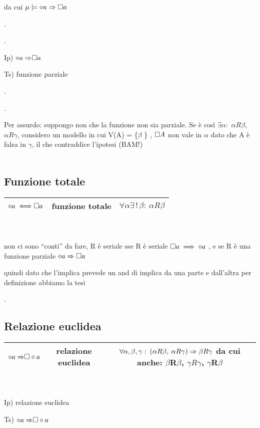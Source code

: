 da cui $\mu\models\diamond a\Rightarrow\square a$

.

.

Ip) $\diamond{a\Rightarrow}\square a$

Ts) funzione parziale

.

.

Per assurdo: suppongo non che la funzione non sia parziale. Se è così
$\exists\alpha:$ $\alpha R\beta,$ $\alpha R\gamma$, considero un
modello in cui V(A) = \{$\beta$ \} , $\square A$ non vale in $\alpha$
dato che A è falsa in $\gamma$, il che contraddice l'ipotesi (BAM!)\\
\\
\subsection{Funzione totale}

\begin{tabular}{|c|c|c|}
\hline 
$\diamond{a\iff}\square a$  & funzione totale  & $\forall\alpha\exists\,!\,\beta:\:\alpha R\beta$ \tabularnewline
\hline 
\end{tabular}\\
\\


non ci sono ``conti'' da fare, R è seriale sse R è seriale $\square a\implies\diamond a$
, e se R è una funzione parziale $\diamond a\Rightarrow\square a$

quindi dato che l'implica prevede un and di implica da una parte e
dall'altra per definizione abbiamo la tesi

.

\subsection{Relazione euclidea}

\begin{tabular}{|c|c|c|}
\hline 
$\diamond{a\Rightarrow}\square\diamond a$  & relazione euclidea  & $\forall\alpha,\beta,\gamma:\:(\alpha R\beta,\:\alpha R\gamma)\Rightarrow\beta R\gamma$
da cui anche: $\beta$R$\beta$, $\gamma R\gamma$, $\gamma$R$\beta$\tabularnewline
\hline 
\end{tabular}\\
\\


Ip) relazione euclidea

Ts) $\diamond{a\Rightarrow}\square\diamond a$


